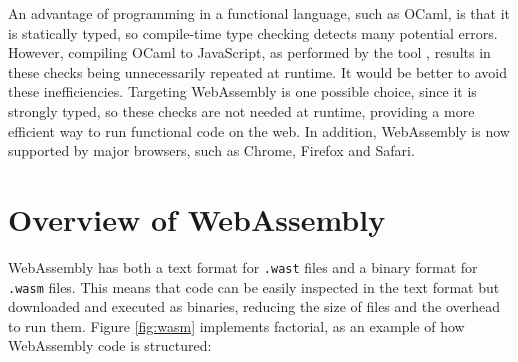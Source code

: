 

An advantage of programming in a functional language, such as OCaml, is that it is statically typed, so compile-time type checking detects many potential errors. However, compiling OCaml to JavaScript, as performed by the \jsofocaml{} tool \cite{jsofocaml}, results in these checks being unnecessarily repeated at runtime. It would be better to avoid these inefficiencies.
Targeting WebAssembly is one possible choice, since it is strongly typed, so these checks are not needed at runtime, providing a more efficient way to run functional code on the web. In addition, WebAssembly is now supported by major browsers, such as Chrome, Firefox and Safari.



\section{Overview of WebAssembly}
WebAssembly has both a text format for \verb|.wast| files and a binary format for \verb|.wasm| files. This means that code can be easily inspected in the text format but downloaded and executed as binaries, reducing the size of files and the overhead to run them. Figure \ref{fig:wasm} implements factorial, as an example of how WebAssembly code is structured:

